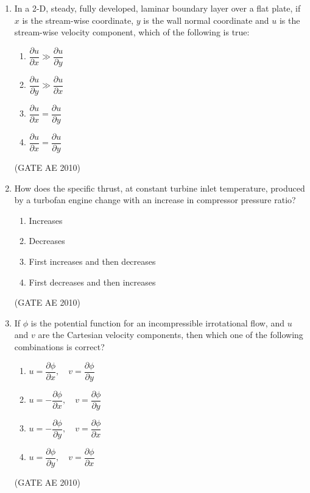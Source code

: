 \documentclass[journal]{IEEEtran}
\begin{document}
\begin{enumerate}
\item In a 2-D, steady, fully developed, laminar boundary layer over a flat plate, if $x$ is the stream-wise coordinate, $y$ is the wall normal coordinate and $u$ is the stream-wise velocity component, which of the following is true:
\begin{multicols}{4}
\begin{enumerate}
\item $\dfrac{\partial u}{\partial x} \gg \dfrac{\partial u}{\partial y}$  
\item $\dfrac{\partial u}{\partial y} \gg \dfrac{\partial u}{\partial x}$  
\item $\dfrac{\partial u}{\partial x} = \dfrac{\partial u}{\partial y}$  
\item $\dfrac{\partial u}{\partial x} = \dfrac{\partial u}{\partial y}$  
\end{enumerate}
\end{multicols}
\hfill (GATE AE 2010)

\item How does the specific thrust, at constant turbine inlet temperature, produced by a turbofan engine change with an increase in compressor pressure ratio?
\begin{multicols}{2}
\begin{enumerate}
\item Increases  
\item Decreases  
\item First increases and then decreases  
\item First decreases and then increases  
\end{enumerate}
\end{multicols}
\hfill (GATE AE 2010)

\item If $\phi$ is the potential function for an incompressible irrotational flow, and $u$ and $v$ are the Cartesian velocity components, then which one of the following combinations is correct?

\begin{multicols}{2}
\begin{enumerate}
\item $u = \dfrac{\partial \phi}{\partial x},\quad v = \dfrac{\partial \phi}{\partial y}$  
\item $u = -\dfrac{\partial \phi}{\partial x},\quad v = \dfrac{\partial \phi}{\partial y}$  
\item $u = -\dfrac{\partial \phi}{\partial y},\quad v = \dfrac{\partial \phi}{\partial x}$  
\item $u = \dfrac{\partial \phi}{\partial y},\quad v = \dfrac{\partial \phi}{\partial x}$  
\end{enumerate}
\end{multicols}
\hfill (GATE AE 2010)


\end{enumerate}
\end{document}
